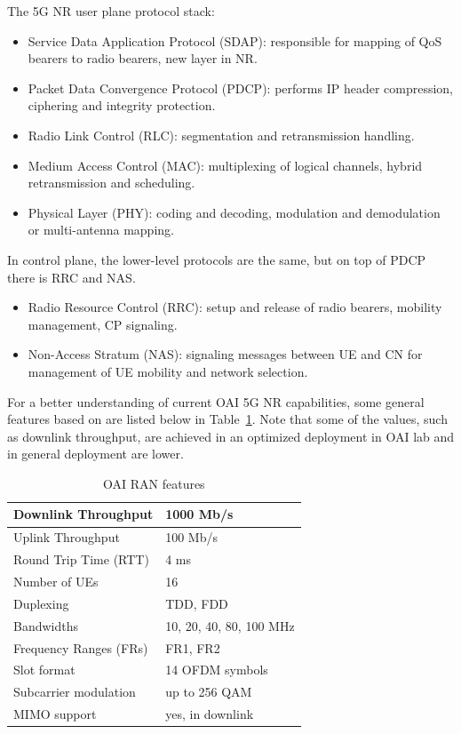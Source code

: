 \documentclass[12pt,a4paper,twoside]{report}
\begin{document}
The 5G NR user plane protocol stack:
\begin{itemize}
	\item Service Data Application Protocol (SDAP): responsible for mapping of QoS bearers to radio bearers, new layer in NR.
	\item Packet Data Convergence Protocol (PDCP): performs IP header compression, ciphering and integrity protection.
	\item Radio Link Control (RLC): segmentation and retransmission handling.
	\item Medium Access Control (MAC): multiplexing of logical channels, hybrid retransmission and scheduling.
	\item Physical Layer (PHY): coding and decoding, modulation and demodulation or multi-antenna mapping.
\end{itemize}
In control plane, the lower-level protocols are the same, but on top of PDCP there is RRC and NAS.
\begin{itemize}
	\item Radio Resource Control (RRC): setup and release of radio bearers, mobility management, CP signaling.
	\item Non-Access Stratum (NAS): signaling messages between UE and CN for management of UE mobility and network selection.
\end{itemize}
%
For a better understanding of current OAI 5G NR capabilities, some general features based on \cite{oai_doc} are listed below in Table~\ref{T:OAI-featureset}. Note that some of the values, such as downlink throughput, are achieved in an optimized deployment in OAI lab and in general deployment are lower.
%
\begin{table}[!ht]
    \centering
    \caption{OAI RAN features}
    \begin{tabular}{|l|l|}
    \hline
        Downlink Throughput & 1000 Mb/s \\ \hline
        Uplink Throughput & 100 Mb/s \\ \hline
        Round Trip Time (RTT) & 4 ms \\ \hline
        Number of UEs & 16 \\ \hline
        Duplexing & TDD, FDD \\ \hline
        Bandwidths & 10, 20, 40, 80, 100 MHz \\ \hline
        Frequency Ranges (FRs) & FR1, FR2 \\ \hline
        Slot format & 14 OFDM symbols \\ \hline
        Subcarrier modulation & up to 256 QAM \\ \hline
        MIMO support & yes, in downlink \\ \hline
    \end{tabular}
    \label{T:OAI-featureset}
\end{table}
\end{document}
